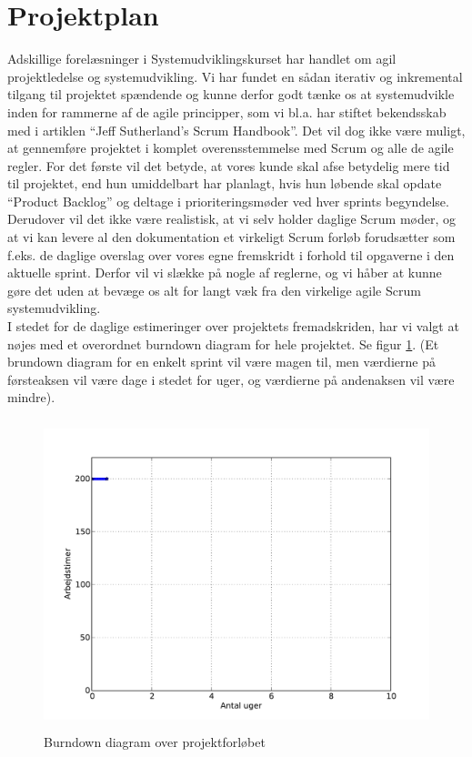 \documentclass[12pt]{article}   %
\begin{document}
\section{Projektplan}
Adskillige forelæsninger i Systemudviklingskurset har handlet om agil
projektledelse og systemudvikling. Vi har fundet en sådan iterativ og
inkremental tilgang til projektet spændende og kunne derfor godt tænke os at
systemudvikle inden for rammerne af de agile principper, som vi bl.a. har
stiftet bekendsskab med i artiklen ``Jeff Sutherland's Scrum
Handbook''\cite{scrum}. Det vil dog ikke være muligt, at gennemføre projektet
i komplet overensstemmelse med Scrum og alle de agile regler. For det første
vil det betyde, at vores kunde skal afse betydelig mere tid til projektet,
end hun umiddelbart har planlagt, hvis hun løbende skal opdate ``Product
Backlog'' og deltage i prioriteringsmøder ved hver sprints begyndelse.
Derudover vil det ikke være realistisk, at vi selv holder daglige Scrum møder,
og at vi kan levere al den dokumentation et virkeligt Scrum forløb
forudsætter som f.eks. de daglige overslag over vores egne fremskridt i forhold
til opgaverne i den aktuelle sprint. Derfor vil vi slække på nogle af 
reglerne, og vi håber at kunne gøre det uden at bevæge os alt for langt væk fra 
den virkelige agile Scrum systemudvikling.\\
I stedet for de daglige estimeringer over projektets fremadskriden, har vi
valgt at nøjes med et overordnet burndown diagram for hele projektet. Se figur
\ref{fig:bd}. (Et brundown diagram for en enkelt sprint vil være magen til,
men værdierne på førsteaksen vil være dage i stedet for uger, og værdierne på
andenaksen vil være mindre). 

\begin{figure}[!ht]
	\centering
\includegraphics[width=13cm, height=9cm]{burndown.pdf}
\caption{Burndown diagram over projektforløbet}
\label{fig:bd}
\end{figure}
\end{document}
